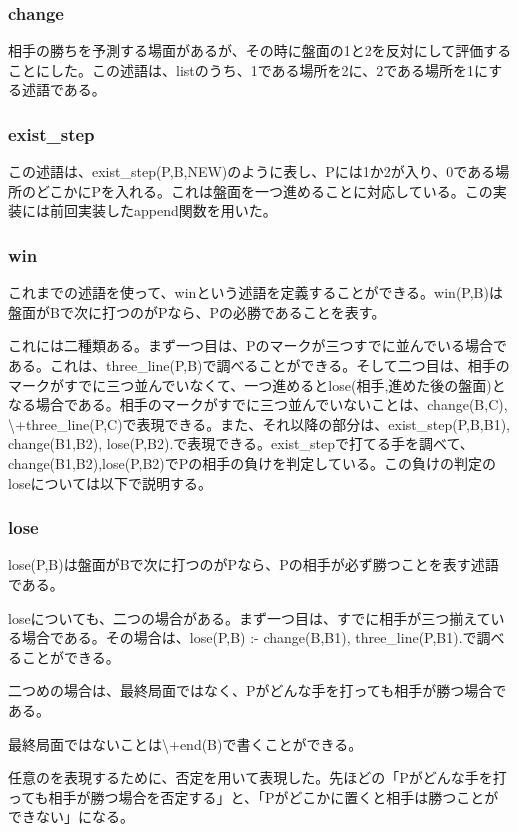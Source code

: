 \documentclass[uplatex,12pt]{jsarticle}
\begin{document}
\subsubsection{change}
相手の勝ちを予測する場面があるが、その時に盤面の1と2を反対にして評価することにした。この述語は、listのうち、1である場所を2に、2である場所を1にする述語である。

\subsubsection{exist\_step}
この述語は、exist\_step(P,B,NEW)のように表し、Pには1か2が入り、0である場所のどこかにPを入れる。これは盤面を一つ進めることに対応している。この実装には前回実装したappend関数を用いた。


\subsubsection{win}
これまでの述語を使って、winという述語を定義することができる。win(P,B)は盤面がBで次に打つのがPなら、Pの必勝であることを表す。

これには二種類ある。まず一つ目は、Pのマークが三つすでに並んでいる場合である。これは、three\_line(P,B)で調べることができる。そして二つ目は、相手のマークがすでに三つ並んでいなくて、一つ進めるとlose(相手,進めた後の盤面)となる場合である。相手のマークがすでに三つ並んでいないことは、change(B,C), \backslash+three\_line(P,C)で表現できる。また、それ以降の部分は、exist\_step(P,B,B1), change(B1,B2), lose(P,B2).で表現できる。exist\_stepで打てる手を調べて、change(B1,B2),lose(P,B2)でPの相手の負けを判定している。この負けの判定のloseについては以下で説明する。

\subsubsection{lose}
lose(P,B)は盤面がBで次に打つのがPなら、Pの相手が必ず勝つことを表す述語である。

loseについても、二つの場合がある。まず一つ目は、すでに相手が三つ揃えている場合である。その場合は、lose(P,B) :- change(B,B1), three\_line(P,B1).で調べることができる。

二つめの場合は、最終局面ではなく、Pがどんな手を打っても相手が勝つ場合である。

最終局面ではないことは\backslash+end(B)で書くことができる。

任意のを表現するために、否定を用いて表現した。先ほどの「Pがどんな手を打っても相手が勝つ場合を否定する」と、「Pがどこかに置くと相手は勝つことができない」になる。
\end{document}
